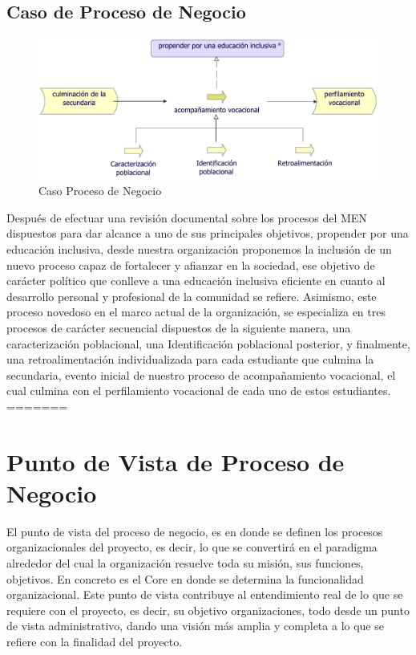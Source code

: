 \subsection{Caso  de Proceso de Negocio}
\begin{figure}[h!]
	\centering
	\includegraphics[width=.9\linewidth]{imgs/caso/negocio/proceso}
	\caption{Caso Proceso de Negocio}
\end{figure}

Después de efectuar una revisión documental sobre los procesos del MEN dispuestos para dar alcance a uno de sus principales objetivos, propender por una educación inclusiva, desde nuestra organización proponemos la inclusión de un nuevo proceso capaz de fortalecer y afianzar en la sociedad, ese objetivo de carácter político que conlleve a una educación inclusiva eficiente en cuanto al desarrollo personal y profesional de la comunidad se refiere. Asimismo, este proceso novedoso en el marco actual de la organización, se especializa en tres procesos de carácter secuencial dispuestos de la siguiente manera, una caracterización poblacional, una Identificación poblacional posterior, y finalmente, una retroalimentación individualizada para cada estudiante que culmina la secundaria, evento inicial de nuestro proceso de acompañamiento vocacional, el cual culmina con el perfilamiento vocacional de cada uno de estos estudiantes.
=======
\section{Punto de Vista de Proceso de Negocio}

El punto de vista del proceso de negocio, es en donde se definen los procesos organizacionales del proyecto, es decir, lo que se convertirá en el paradigma alrededor del cual la organización resuelve toda su misión, sus funciones, objetivos. En concreto es el Core en donde se determina la funcionalidad organizacional.
Este punto de vista contribuye al entendimiento real de lo que se requiere con el proyecto, es decir, su objetivo organizaciones, todo desde un punto de vista administrativo, dando una visión más amplia y completa a lo que se refiere con la finalidad del proyecto.

